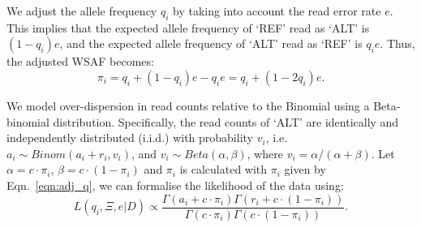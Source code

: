 \documentclass{bioinfo}
\begin{document}
We adjust the allele frequency $q_i$ by taking into account the read error rate $e$. This implies that the expected allele frequency of `REF' read as `ALT' is $(1 - q_i)e$, and the expected allele frequency of `ALT' read as `REF' is $q_ie$. Thus, the adjusted WSAF becomes:
\begin{equation}
\pi_i = q_i + (1 - q_i)e - q_ie = q_i + (1 - 2q_i)e.\label{eqn:adj_q}
\end{equation}

We model over-dispersion in read counts relative to the Binomial using a Beta-binomial distribution. Specifically, the read counts of `ALT' are identically and independently distributed (i.i.d.) with probability $v_i$, i.e. $a_i \sim Binom(a_i + r_i, v_i)$, and $v_i \sim Beta(\alpha, \beta)$, where $v_i = \alpha/(\alpha+\beta)$. Let $\alpha = c\cdot \pi_{i} $, $\beta = c\cdot (1-\pi_{i})$ and $\pi_i$ is calculated with $\pi_i$ given by Eqn.~\eqref{eqn:adj_q}, we can formalise the likelihood of the data using: %
\begin{equation}
L(q_{i}, \Xi, e | D) \propto \frac{\Gamma(a_i + c\cdot \pi_{i}) \Gamma(r_i + c\cdot (1-\pi_{i}))}{\Gamma(c\cdot \pi_{i})\Gamma(c\cdot (1-\pi_{i}))}. \label{eqn:llk}
\end{equation}
\end{document}
